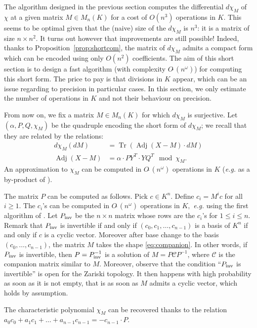 \documentclass{sig-alternate-05-2015}
\DeclareMathOperator{\tr}{Tr}
\DeclareMathOperator{\adj}{Adj}
\newcommand{\softO}{O\tilde{~}}
\newcommand{\inv}{\text{\rm inv}}
\begin{document}
The algorithm designed in the previous section computes the differential 
$d \chi_M$ of $\chi$ at a given matrix $M \in M_n(K)$ for a cost of 
$O(n^3)$ operations in $K$. This seems to be optimal given that the 
(naive) size of the $d \chi_M$ is $n^3$: it is a matrix of size $n
\times n^2$. It turns out however that improvements are still possible!
Indeed, thanks to Proposition~\ref{prop:shortcom}, the matrix of 
$d \chi_M$ admits a compact form which can be encoded using only $O(n^2)$ 
coefficients. The aim of this short section is to design a fast 
algorithm (with complexity $\softO(n^\omega)$) for computing this short 
form. The price to pay is that divisions in $K$ appear, which can be an 
issue regarding to precision in particular cases.
In this section, we only estimate the number of operations in $K$
and not their behaviour on precision.

From now on, we fix a matrix $M \in M_n(K)$ for which $d \chi_M$ is 
surjective. Let $(\alpha, P, Q, \chi_M)$ be the quadruple encoding
the short form of $d \chi_M$; we recall that they are related by the
relations:
\begin{align*}
d \chi_M(dM) & =\tr(\adj(X{-}M) \cdot dM) \\
\adj(X{-}M) & = \alpha \cdot P Y^T \cdot Y Q^T \mod \chi_M.
\end{align*}
An approximation to $\chi_M$ can be computed in $\softO(n^\omega)$ operations in $K$
(\textit{e.g.} as a by-product of \cite{storjohann:01a}).

The matrix $P$ can be computed as follows. Pick $c \in K^n$. Define 
$c_i = M^i c$ for all $i \geq 1$. The $c_i$'s can be computed in 
$\softO(n^\omega)$ operations in $K,$ \textit{e.g.}
using the first algorithm
of \cite{keller-gehrig:85a}. Let $P_\inv$ be the 
$n \times n$ matrix whose rows are the $c_i$'s for $1 \leq i \leq n$. 
Remark that $P_\inv$ is invertible if and only if $(c_0, c_1, \ldots, 
c_{n-1})$ is a basis of $K^n$ if and only if $c$ is a cyclic vector. 
Moreover after base change to the basis $(c_0, \ldots, c_{n-1})$, the matrix 
$M$ takes the shape \eqref{eq:companion}. In other words, if $P_\inv$
is invertible, then $P = P_\inv^{-1}$ is a solution of $M = P \mathscr{C} P^{-1}$,
where $\mathscr{C}$ is the companion matrix similar to $M$.
Moreover, observe that the condition ``$P_\inv$ is invertible'' is open
for the Zariski topology. It then happens with high probability as soon
as it is not empty, that is as soon as $M$ admits a cyclic vector, which
holds by assumption.


The characteristic polynomial $\chi_M$ can be recovered thanks to the
relation $a_0c_0 + a_1c_1 + \dots + a_{n-1}c_{n-1} = -c_{n-1} \cdot P$.
\end{document}
